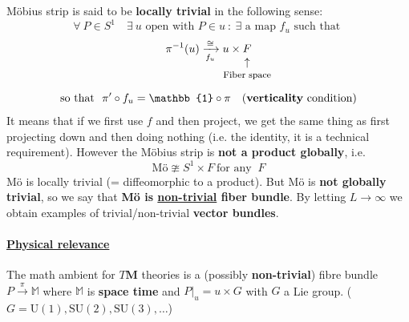 \documentclass[../main.tex]{subfiles}
\begin{document}
Möbius strip is said to be \textbf{locally trivial} in the following sense:
\[
\forall\ P\in S^1 \quad \exists \ u \textrm{ open with } P\in u \ : \ \exists \textrm{ a map } f_u \textrm{ such that }
\]
\[
\pi^{-1}(u) \xrightarrow[f_u]{\cong} u\times \underset{\mathclap{\tikz \node {$\uparrow$} node [below=1ex] {\footnotesize Fiber space};}}{F} 
\]
\[
\textrm{so that }\ \pi'\circ f_u = \mathbb{1}\circ\pi \quad  \textrm{(\textbf{verticality} condition)}
\]
It means that if we first use $f$ and then project, we get the same thing as first projecting down and then doing nothing (i.e. the identity, it is a technical requirement). However the Möbius strip is \textbf{not a product globally}, i.e.
\[
\textrm{Mö}\ncong S^1 \times F \ \textrm{for any } \ F
\]
Mö is locally trivial (= diffeomorphic to a product). But Mö is \textbf{not globally trivial}, so we say that \textbf{Mö is \underline{non-trivial} fiber bundle}. By letting $L\to\infty$ we obtain examples of trivial/non-trivial \textbf{vector bundles}.
\newline
\paragraph{\underline{Physical relevance}} The math ambient for $T\mathbf{M}$ theories is a (possibly \textbf{non-trivial}) fibre bundle $P\xrightarrow{\pi}\mathbb{M}$ where $\mathbb{M}$ is \textbf{space time} and $P\big|_u=u\times G$ with $G$ a Lie group. ($G=\textrm{U}(1),\textrm{SU}(2),\textrm{SU}(3),\dots$)
\end{document}
